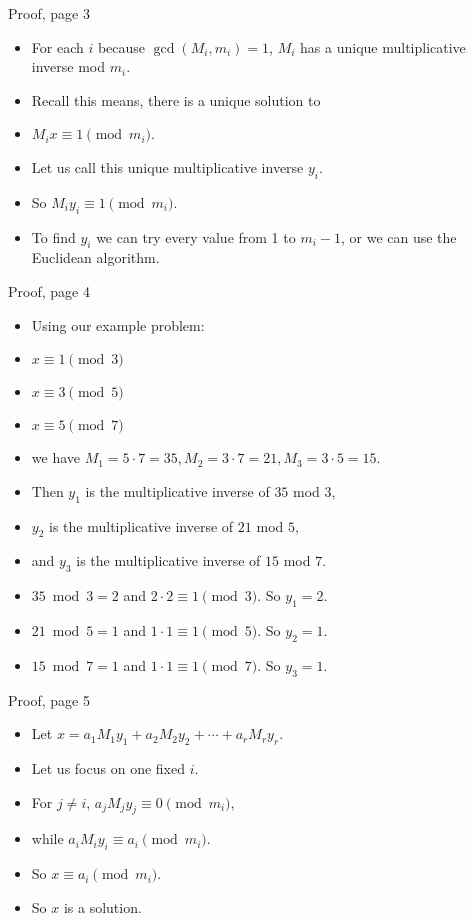 \documentclass{beamer}
\begin{document}
\begin{frame}{Proof, page 3}

\begin{itemize}
  \item For each $i$ because $\gcd(M_i, m_i)=1$, $M_i$ has a unique multiplicative inverse mod $m_i$.
  \item Recall this means, there is a unique solution to
  \item $M_i x \equiv 1 \pmod {m_i}$.
  \item Let us call this unique multiplicative inverse $y_i$.
  \item So $M_i y_i \equiv 1 \pmod {m_i}$.
  \item To find $y_i$ we can try every value from 1 to $m_i-1$, or we can use the Euclidean algorithm.
\end{itemize}

\end{frame}

\begin{frame}{Proof, page 4}

\begin{itemize}
  \item Using our example problem:
  \item $x \equiv 1 \pmod 3$
  \item $x \equiv 3 \pmod 5$
  \item $x \equiv 5 \pmod 7$
  \item we have $M_1 = 5\cdot 7 = 35, M_2 = 3\cdot 7 = 21, M_3 = 3\cdot 5 = 15$.
  \item Then $y_1$ is the multiplicative inverse of $35$ mod $3$,
  \item $y_2$ is the multiplicative inverse of $21$ mod $5$,
  \item and $y_3$ is the multiplicative inverse of $15$ mod $7$.
  \item $35 \bmod 3 =2$ and $2\cdot 2 \equiv 1 \pmod 3$. So $y_1 = 2$.
  \item $21 \bmod 5 = 1$ and  $1\cdot 1 \equiv 1 \pmod 5$. So $y_2 = 1$.
  \item $15 \bmod 7 = 1$ and $1\cdot 1 \equiv 1 \pmod 7$. So $y_3 = 1$.
\end{itemize}

\end{frame}

\begin{frame}{Proof, page 5}

\begin{itemize}
  \item Let $x = a_1 M_1 y_1 + a_2 M_2 y_2 + \cdots + a_r M_r y_r$.
  \item Let us focus on one fixed $i$.
  \item For $j\not=i$, $a_j M_j y_j \equiv 0 \pmod {m_i}$,
  \item while $a_i M_i y_i \equiv a_i \pmod {m_i}$.
  \item So $x \equiv a_i \pmod {m_i}$.
  \item So $x$ is a solution.
\end{itemize}

\end{frame}
\end{document}
